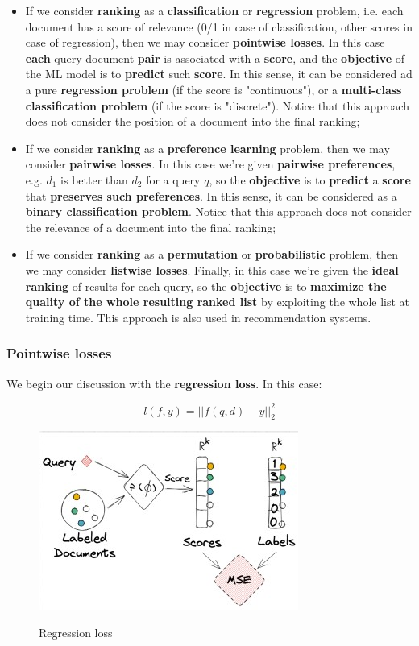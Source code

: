 \begin{itemize}
    \item If we consider \textbf{ranking} as a \textbf{classification} or \textbf{regression} problem, i.e. each document has a score of relevance (0/1 in case of classification, other scores in case of regression), then we may consider \textbf{pointwise losses}. In this case \textbf{each} query-document \textbf{pair} is associated with a \textbf{score}, and the \textbf{objective} of the ML model is to \textbf{predict} such \textbf{score}. In this sense, it can be considered ad a pure \textbf{regression problem} (if the score is "continuous"), or a \textbf{multi-class classification problem} (if the score is "discrete"). Notice that this approach does not consider the position of a document into the final ranking;

    \item If we consider \textbf{ranking} as a \textbf{preference learning} problem, then we may consider \textbf{pairwise losses}. In this case we're given \textbf{pairwise preferences}, e.g. $d_1$ is better than $d_2$ for a query $q$, so the \textbf{objective} is to \textbf{predict} a \textbf{score} that \textbf{preserves such preferences}. In this sense, it can be considered as a \textbf{binary classification problem}. Notice that this approach does not consider the relevance of a document into the final ranking;
    
    \item If we consider \textbf{ranking} as a \textbf{permutation} or \textbf{probabilistic} problem, then we may consider \textbf{listwise losses}. Finally, in this case we're given the \textbf{ideal ranking} of results for each query, so the \textbf{objective} is to \textbf{maximize the quality of the whole resulting ranked list} by exploiting the whole list at training time. This approach is also used in recommendation systems.
\end{itemize}


\subsubsection{Pointwise losses}

We begin our discussion with the \textbf{regression loss}. In this case:

$$
l(f,y) = ||f(q,d) - y||_2^2
$$

\begin{figure}[h!]
		\centering
		\includegraphics[scale = 2.0]{img/regression losses.jpg}
        \label{regression losses}
        \caption{Regression loss}
\end{figure}

